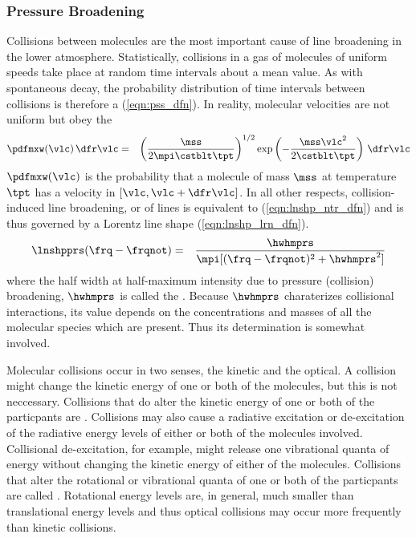 \documentclass[12pt]{article}
\begin{document}
\subsubsection[Pressure Broadening]{Pressure Broadening}\label{sxn:lnshp_prs}
Collisions between molecules are the most important cause of line
broadening in the lower atmosphere.
Statistically, collisions in a gas of molecules of uniform speeds take 
place at random time intervals about a mean value.
As with spontaneous decay, the probability distribution of time
intervals between collisions is therefore a  (\ref{eqn:pss_dfn}).
In reality, molecular velocities are not uniform but obey the
\begin{eqnarray}
\pdfmxw(\vlc) \,\dfr\vlc & = & 
\left( \frac{\mss}{2\mpi \cstblt \tpt} \right)^{1/2} 
\exp \left( -\frac{\mss \vlc^{2}}{2 \cstblt \tpt} \right) \,\dfr\vlc
\label{eqn:mxw_dst_dfn}
\end{eqnarray}
$\pdfmxw(\vlc)$ is the probability that a molecule of mass $\mss$ 
at temperature $\tpt$ has a velocity in $[\vlc,\vlc+\dfr\vlc]$.
In all other respects, collision-induced line broadening, or
 of lines is equivalent to
(\ref{eqn:lnshp_ntr_dfn}) and is thus governed by
a Lorentz line shape (\ref{eqn:lnshp_lrn_dfn}).
\begin{eqnarray}
\lnshpprs(\frq-\frqnot) & = & \frac{\hwhmprs}{\mpi [ (\frq - \frqnot)^{2} + \hwhmprs^{2} ] } 
\label{eqn:lnshp_prs_dfn}
\end{eqnarray}
where the half width at half-maximum intensity due to pressure
(collision) broadening, $\hwhmprs$ is called the
. 
Because $\hwhmprs$ charaterizes collisional interactions, its value
depends on the concentrations and masses of all the molecular species
which are present.
Thus its determination is somewhat involved.

Molecular collisions occur in two senses, the kinetic and the
optical. 
A collision might change the kinetic energy of one or both of the
molecules, but this is not neccessary. 
Collisions that do alter the kinetic energy of one or both of the 
particpants are . 
Collisions may also cause a radiative excitation or de-excitation
of the radiative energy levels of either or both of the molecules
involved. 
Collisional de-excitation, for example, might release one vibrational
quanta of energy without changing the kinetic energy of either of the
molecules.  
Collisions that alter the rotational or vibrational quanta of one or
both of the particpants are called .
Rotational energy levels are, in general, much smaller than
translational energy levels and thus optical collisions may occur more
frequently than kinetic collisions.
\end{document}
